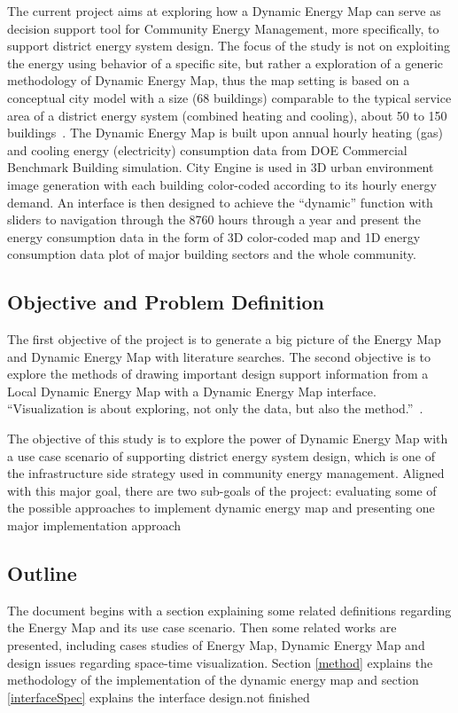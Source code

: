 \documentclass[hidelinks,12pt]{article}
\newcommand{\grey}[1]{\textcolor{black!30}{#1}}
\begin{document}
The current project aims at exploring how a Dynamic Energy Map can
serve as decision support tool for Community Energy Management, more
specifically, to support district energy system design. The focus of
the study is not on exploiting the energy using behavior of a specific
site, but rather a exploration of a generic methodology of Dynamic
Energy Map, thus the map setting is based on a conceptual city model
with a size (68 buildings) comparable to the typical service area of a
district energy system (combined heating and cooling), about 50 to 150
buildings~\cite{IDEA2005}. The Dynamic Energy Map is built upon annual
hourly heating (gas) and cooling energy (electricity) consumption data
from DOE Commercial Benchmark Building simulation. City Engine is used
in 3D urban environment image generation with each building
color-coded according to its hourly energy demand. An interface is
then designed to achieve the ``dynamic'' function with sliders to
navigation through the 8760 hours through a year and present the
energy consumption data in the form of 3D color-coded map and 1D
energy consumption data plot of major building sectors and the whole
community.

\subsection{Objective and Problem Definition}
The first objective of the project is to generate a big picture of the
Energy Map and Dynamic Energy Map with literature searches. The second
objective is to explore the methods of drawing important design
support information from a Local Dynamic Energy Map with a Dynamic
Energy Map interface. ``Visualization is about exploring, not only the
data, but also the method.''~\cite{Dorling1992}. 

The objective of this study is to explore the power of Dynamic Energy
Map with a use case scenario of supporting district energy system
design, which is one of the infrastructure side strategy used in
community energy management. Aligned with this major goal, there are
two sub-goals of the project: evaluating some of the possible
approaches to implement dynamic energy map and presenting one major
implementation approach

\subsection{Outline}
The document begins with a section explaining some related definitions
regarding the Energy Map and its use case scenario. Then some related
works are presented, including cases studies of Energy Map, Dynamic
Energy Map and design issues regarding space-time visualization.
Section \ref{method} explains the methodology of the implementation of
the dynamic energy map and section \ref{interfaceSpec} explains the
interface design.\grey{not finished}
\end{document}
